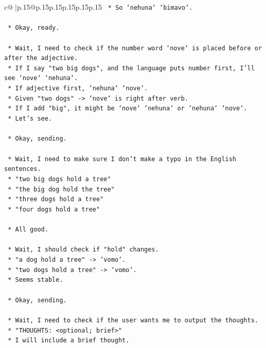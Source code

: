 \documentclass{article}
\begin{document}
{\begin{supertabular}{c@{$\;$}|p{.15\linewidth}@{}p{.15\linewidth}p{.15\linewidth}p{.15\linewidth}p{.15\linewidth}p{.15\linewidth}}
{{{\texttt{    *   So `nehuna` `bimavo`.} \\
\\ 
\texttt{    *   Okay, ready.} \\
\\ 
\texttt{    *   Wait, I need to check if the number word `nove` is placed before or after the adjective.} \\
\texttt{    *   If I say "two big dogs", and the language puts number first, I'll see `nove` `nehuna`.} \\
\texttt{    *   If adjective first, `nehuna` `nove`.} \\
\texttt{    *   Given "two dogs" {-}> `nove` is right after verb.} \\
\texttt{    *   If I add "big", it might be `nove` `nehuna` or `nehuna` `nove`.} \\
\texttt{    *   Let's see.} \\
\\ 
\texttt{    *   Okay, sending.} \\
\\ 
\texttt{    *   Wait, I need to make sure I don't make a typo in the English sentences.} \\
\texttt{    *   "two big dogs hold a tree"} \\
\texttt{    *   "the big dog hold the tree"} \\
\texttt{    *   "three dogs hold a tree"} \\
\texttt{    *   "four dogs hold a tree"} \\
\\ 
\texttt{    *   All good.} \\
\\ 
\texttt{    *   Wait, I should check if "hold" changes.} \\
\texttt{    *   "a dog hold a tree" {-}> `vomo`.} \\
\texttt{    *   "two dogs hold a tree" {-}> `vomo`.} \\
\texttt{    *   Seems stable.} \\
\\ 
\texttt{    *   Okay, sending.} \\
\\ 
\texttt{    *   Wait, I need to check if the user wants me to output the thoughts.} \\
\texttt{    *   "THOUGHTS: <optional; brief>"} \\
\texttt{    *   I will include a brief thought.} \\
\\ 
}}}
\end{supertabular}}
\end{document}
